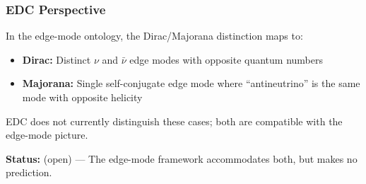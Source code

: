 \subsubsection{EDC Perspective}

\begin{remark}
In the edge-mode ontology, the Dirac/Majorana distinction maps to:
\begin{itemize}[nosep]
    \item \textbf{Dirac:} Distinct $\nu$ and $\bar\nu$ edge modes with opposite
          quantum numbers
    \item \textbf{Majorana:} Single self-conjugate edge mode where ``antineutrino''
          is the same mode with opposite helicity
\end{itemize}
EDC does not currently distinguish these cases; both are compatible with the
edge-mode picture.
\end{remark}

\textbf{Status:} (open) --- The edge-mode framework accommodates both, but
makes no prediction.


